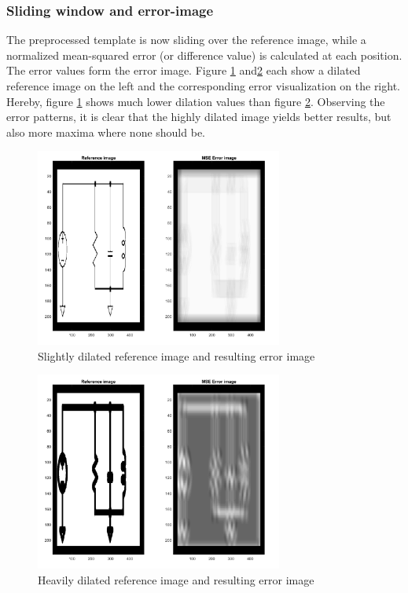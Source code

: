 \documentclass[10pt,twocolumn,letterpaper]{article}
\begin{document}
\subsubsection*{Sliding window and error-image}

The preprocessed template is now sliding over the reference image, while a normalized mean-squared error (or difference value) is calculated at each position. The error values form the error image. Figure \ref{fig:detSW1} and\ref{fig:detSW2} each show a dilated reference image on the left and the corresponding error visualization on the right. Hereby, figure \ref{fig:detSW1} shows much lower dilation values than figure \ref{fig:detSW2}. Observing the error patterns, it is clear that the highly dilated image yields better results, but also more maxima where none should be.
\par

\begin{figure}[!ht]
\includegraphics[width = 3.2in]{img/detSW1.png}
\caption{Slightly dilated reference image and resulting error image}
\label{fig:detSW1}
\end{figure}
\par

\begin{figure}[!ht]
\includegraphics[width = 3.2in]{img/detSW2.png}
\caption{Heavily dilated reference image and resulting error image}
\label{fig:detSW2}
\end{figure}
\end{document}
